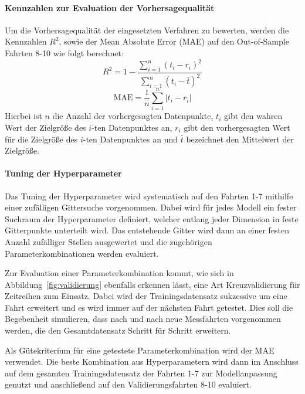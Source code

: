 \paragraph{Kennzahlen zur Evaluation der Vorhersagequalit\"at}

Um die Vorhersagequalit\"at der eingesetzten Verfahren zu bewerten, werden die Kennzahlen
$R^2$, sowie der Mean Absolute Error (MAE) auf den Out-of-Sample Fahrten 8-10 wie folgt berechnet:
\begin{equation}
    R^2 = 1 - \frac{\sum_{i=1}^n \left( t_i - r_i \right)^2}{\sum_{i=1}^n \left( t_i - \bar{t} \right)^2}
\end{equation}
\begin{equation}
    \text{MAE} = \frac{1}{n} \sum_{i=1}^n \left| t_i - r_i \right|
\end{equation}
Hierbei ist $n$ die Anzahl der vorhergesagten Datenpunkte, $t_i$ gibt den wahren Wert der Zielgr\"o{\ss}e des $i$-ten Datenpunktes an,
$r_i$ gibt den vorhergesagten Wert f\"ur die Zielgr\"o{\ss}e des $i$-ten Datenpunktes an und $\bar{t}$ bezeichnet den Mittelwert der
Zielgr\"o{\ss}e.

\paragraph{Tuning der Hyperparameter}

Das Tuning der Hyperparameter wird systematisch auf den Fahrten 1-7 mithilfe einer zuf\"alligen Gittersuche vorgenommen.
Dabei wird f\"ur jedes Modell ein fester Suchraum der Hyperparameter definiert, welcher entlang jeder Dimension in feste
Gitterpunkte unterteilt wird. Das entstehende Gitter wird dann an einer festen Anzahl zuf\"alliger Stellen ausgewertet
und die zugeh\"origen Parameterkombinationen werden evaluiert.

Zur Evaluation einer Parameterkombination kommt, wie sich in Abbildung~\ref{fig:validierung} ebenfalls
erkennen l\"asst, eine Art Kreuzvalidierung f\"ur Zeitreihen zum Einsatz. Dabei wird der Trainingsdatensatz sukzessive um eine Fahrt
erweitert und es wird immer auf der n\"achsten Fahrt getestet.
Dies soll die Begebenheit simulieren, dass nach und nach neue Messfahrten
vorgenommen werden, die den Gesamtdatensatz Schritt f\"ur Schritt erweitern.

Als G\"utekriterium f\"ur eine getestete Parameterkombination wird der MAE verwendet. Die beste Kombination aus Hyperparametern
wird dann im Anschluss auf dem gesamten Trainingsdatensatz der Fahrten 1-7 zur Modellanpassung genutzt und anschlie{\ss}end
auf den Validierungsfahrten 8-10 evaluiert.

